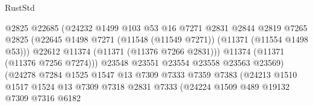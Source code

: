 \begin{lexlean}{RustStd}
\begin{coremodule}
                                        @2825
                                        @22685
                                        (@24232
                                          @1499
                                          @103
                                          @53
                                          @16
                                          @7271
                                          @2831
                                          @2844
                                          @2819
                                          @7265
                                          @2825
                                          (@22645
                                            @1498
                                            @7271
                                            (@11548 (@11549 @7271))
                                            (@11371 (@11554 @1498 @53)))
                                          @22612
                                          @11374
                                          (@11371 (@11376 @7266 @2831)))
                                        @11374
                                        (@11371 (@11376 @7256 @7274)))
                                      @23548
                                      @23551
                                      @23554
                                      @23558
                                      @23563
                                      @23569)
                                    (@24278
                                      @7284
                                      @1525
                                      @1547
                                      @13
                                      @7309
                                      @7333
                                      @7359
                                      @7383
                                      (@24213
                                        @1510
                                        @1517
                                        @1524
                                        @13
                                        @7309
                                        @7318
                                        @2831
                                        @7333
                                        (@24224
                                          @1509
                                          @489
                                          @19132
                                          @7309
                                          @7316
                                          @6182

\end{coremodule}
\end{lexlean}
